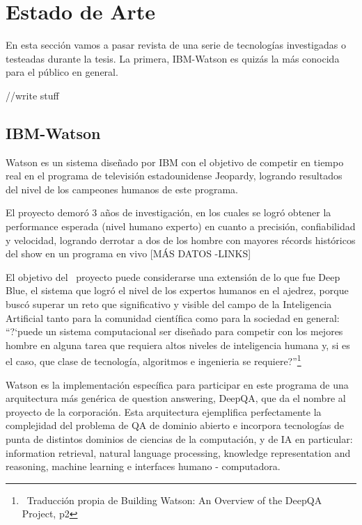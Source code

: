 \chapter{Estado de Arte}

En esta secci\'on vamos a pasar revista de una serie de tecnolog\'ias
investigadas o testeadas durante la tesis. La primera, IBM-Watson es
quiz\'as la m\'as conocida para el p\'ublico en general. 


//write stuff\newline


\section{IBM-Watson}

Watson es un sistema dise\~nado por IBM con el objetivo de competir en
tiempo real en el programa de televisi\'on estadounidense Jeopardy,
logrando resultados del nivel de los campeones humanos de este
programa.

El proyecto demor\'o 3 a\~nos de investigaci\'on, en los cuales se
logr\'o obtener la performance esperada (nivel humano experto) en
cuanto a precisi\'on, confiabilidad y velocidad, logrando derrotar a
dos de los hombre con mayores r\'ecords hist\'oricos del show en un
programa en vivo [M\'AS DATOS -LINKS]

El objetivo del \ proyecto puede considerarse una extensi\'on de lo que
fue Deep Blue, el sistema que logr\'o el nivel de los expertos humanos
en el ajedrez, porque busc\'o superar un reto que significativo y
visible del campo de la Inteligencia Artificial tanto para la comunidad
cient\'ifica como para la sociedad en general:
{\textquotedblleft}?`puede un sistema computacional ser dise\~nado para
competir con los mejores hombre en alguna tarea que requiera altos
niveles de inteligencia humana y, si es el caso, que clase de
tecnolog\'ia, algoritmos e ingenieria se
requiere?{\textquotedblright}\footnote{\ Traducci\'on propia de
Building Watson: An Overview of the DeepQA Project, p2}

Watson es la implementaci\'on espec\'ifica para participar en este
programa de una arquitectura m\'as gen\'erica de question answering,
DeepQA, que da el nombre al proyecto de la corporaci\'on. Esta
arquitectura ejemplifica perfectamente la complejidad del problema de
QA de dominio abierto e incorpora tecnolog\'ias de punta de distintos
dominios de ciencias de la computaci\'on, y de IA en particular:
information retrieval, natural language processing, knowledge
representation and reasoning, machine learning e interfaces humano -
computadora.

